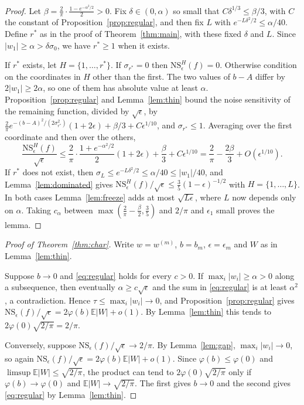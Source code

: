 \documentclass[11pt]{amsart}
\theoremstyle{remark}
\numberwithin{equation}{section}
\newcommand{\EE}{\mathbb{E}}
\begin{document}
\begin{proof}
Let $\beta=\frac2\pi\cdot\frac{1-e^{-\alpha^2/2}}{2}>0$. Fix $\delta\in(0,\alpha)$ so small that $C\delta^{1/3}\le\beta/3$, with $C$ the constant of Proposition~\ref{prop:regular}, and then fix $L$ with $e^{-L\delta^2/2}\le\alpha/40$. Define $r^*$ as in the proof of Theorem~\ref{thm:main}, with these fixed $\delta$ and $L$. Since $|w_1|\ge\alpha>\delta\sigma_0$, we have $r^*\ge1$ when it exists.

If $r^*$ exists, let $H=\{1,\dots,r^*\}$. If $\sigma_{r^*}=0$ then $\mathrm{NS}^H_\epsilon(f)=0$. Otherwise condition on the coordinates in $H$ other than the first. The two values of $b-A$ differ by $2|w_1|\ge2\alpha$, so one of them has absolute value at least $\alpha$. Proposition~\ref{prop:regular} and Lemma~\ref{lem:thin} bound the noise sensitivity of the remaining function, divided by $\sqrt\epsilon$, by $\frac2\pi e^{-(b-A)^2/(2\sigma_{r^*}^2)}(1+2\epsilon)+\beta/3+C\epsilon^{1/10}$, and $\sigma_{r^*}\le1$. Averaging over the first coordinate and then over the others,
\[
\frac{\mathrm{NS}^H_\epsilon(f)}{\sqrt\epsilon}\le\frac2\pi\cdot\frac{1+e^{-\alpha^2/2}}2(1+2\epsilon)+\frac\beta3+C\epsilon^{1/10}=\frac2\pi-\frac{2\beta}3+O(\epsilon^{1/10}).
\]
If $r^*$ does not exist, then $\sigma_L\le e^{-L\delta^2/2}\le\alpha/40\le|w_1|/40$, and Lemma~\ref{lem:dominated} gives $\mathrm{NS}^H_\epsilon(f)/\sqrt\epsilon\le\frac35(1-\epsilon)^{-1/2}$ with $H=\{1,\dots,L\}$. In both cases Lemma~\ref{lem:freeze} adds at most $\sqrt{L\epsilon}$, where $L$ now depends only on $\alpha$. Taking $c_\alpha$ between $\max(\frac2\pi-\frac\beta2,\frac35)$ and $2/\pi$ and $\epsilon_1$ small proves the lemma.
\end{proof}

\begin{proof}[Proof of Theorem~\ref{thm:char}]
Write $w=w^{(m)}$, $b=b_m$, $\epsilon=\epsilon_m$ and $W$ as in Lemma~\ref{lem:thin}.

Suppose $b\to0$ and \eqref{eq:regular} holds for every $c>0$. If $\max_i|w_i|\ge\alpha>0$ along a subsequence, then eventually $\alpha\ge c\sqrt\epsilon$ and the sum in \eqref{eq:regular} is at least $\alpha^2$, a contradiction. Hence $\tau\le\max_i|w_i|\to0$, and Proposition~\ref{prop:regular} gives $\mathrm{NS}_\epsilon(f)/\sqrt\epsilon=2\varphi(b)\EE|W|+o(1)$. By Lemma~\ref{lem:thin} this tends to $2\varphi(0)\sqrt{2/\pi}=2/\pi$.

Conversely, suppose $\mathrm{NS}_\epsilon(f)/\sqrt\epsilon\to2/\pi$. By Lemma~\ref{lem:gap}, $\max_i|w_i|\to0$, so again $\mathrm{NS}_\epsilon(f)/\sqrt\epsilon=2\varphi(b)\EE|W|+o(1)$. Since $\varphi(b)\le\varphi(0)$ and $\limsup\EE|W|\le\sqrt{2/\pi}$, the product can tend to $2\varphi(0)\sqrt{2/\pi}$ only if $\varphi(b)\to\varphi(0)$ and $\EE|W|\to\sqrt{2/\pi}$. The first gives $b\to0$ and the second gives \eqref{eq:regular} by Lemma~\ref{lem:thin}.
\end{proof}
\end{document}
